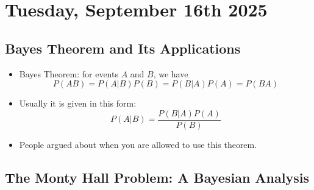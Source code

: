 \section{Tuesday, September 16th 2025}

\subsection{Bayes Theorem and Its Applications}

\begin{itemize}
      \item Bayes Theorem: for events $A$ and $B$, we have
            \[ \boxed{P(AB) = P(A|B) P(B) = P(B|A) P(A) = P(BA)} \]

      \item Usually it is given in this form:
            \[ P(A|B) = \frac{P(B|A) P(A)}{P(B)} \]

      \item People argued about when you are allowed to use this theorem.
\end{itemize}

\subsection{The Monty Hall Problem: A Bayesian Analysis}

